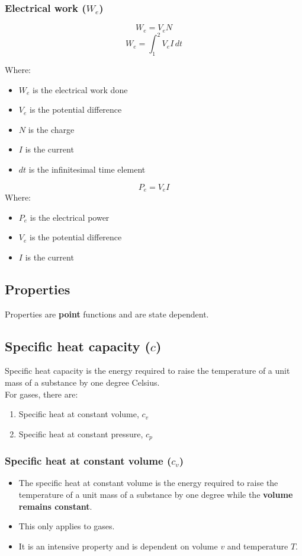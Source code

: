 \documentclass[11pt]{article}
\begin{document}
\newpage

\subsubsection{Electrical work (\(W_e\))}
\label{sec:org28f9b71}
\[W_e = V_e N\]
\[W_e = \int_1^2 V_e I \, dt\]

Where:
\begin{itemize}
\item \(W_e\) is the electrical work done
\item \(V_e\) is the potential difference
\item \(N\) is the charge
\item \(I\) is the current
\item \(dt\) is the infinitesimal time element
\end{itemize}

\[P_e = V_e I\]
Where:
\begin{itemize}
\item \(P_e\) is the electrical power
\item \(V_e\) is the potential difference
\item \(I\) is the current
\end{itemize}

\subsection{Properties}
\label{sec:org4a88bb0}
Properties are \textbf{point} functions and are state dependent.

\subsection{Specific heat capacity (\(c\))}
\label{sec:org439f040}
Specific heat capacity is the energy required to raise the temperature of a unit mass of a substance by one degree Celsius.
\\[0pt]

For gases, there are:
\begin{enumerate}
\item Specific heat at constant volume, \(c_v\)
\item Specific heat at constant pressure, \(c_p\)
\end{enumerate}

\newpage

\subsubsection{Specific heat at constant volume (\(c_v\))}
\label{sec:orgd3ca7a9}
\begin{itemize}
\item The specific heat at constant volume is the energy required to raise the temperature of a unit mass of a substance by one degree while the \textbf{volume remains constant}.
\item This only applies to gases.
\item It is an intensive property and is dependent on volume \(v\) and temperature \(T\).
\end{itemize}
\end{document}
